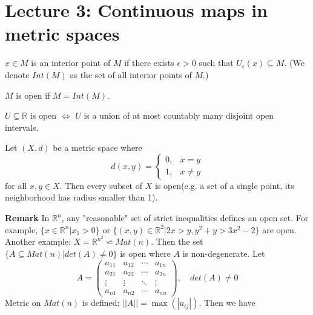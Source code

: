 \documentclass[main.tex]{subfiles}
\begin{document}
\pagestyle{plain}
\setcounter{chapter}{2}

\chapter{Lecture 3: Continuous maps in metric spaces}
\label{chap:chapter3}

\begin{definition}
    $x\in M$ is an interior point of $M$ if there exists $\epsilon > 0$ such that $U_{\epsilon} (x) \subseteq M$. (We denote $Int(M)$ as the set of all interior points of $M$.)
\end{definition}

\begin{definition}
    $M$ is open if $M = Int(M)$. 
\end{definition}
\begin{theorem}
    $U \subseteq \mathbb{R}$ is open $\Longleftrightarrow$ $U$ is a union of at most countably many disjoint open intervals.
\end{theorem}
\begin{example}
    Let $(X, d)$ be a metric space where \[ d(x, y) = \begin{cases} 0, & x = y \\ 1, & x \ne y \end{cases} \] for all $x, y \in X$. Then every subset of $X$ is open(e.g. a set of a single point, its neighborhood has radius smaller than 1).
\end{example}
\par \noindent \textbf{Remark} In $\mathbb{R}^n$, any "reasonable" set of strict inequalities defines an open set. For example, $\{x\in \mathbb{R}^n| x_1 > 0\}$ or $\{(x, y)\in \mathbb{R}^2| 2x > y, y^2 + y > 3x^2 -2\}$ are open. Another example: $X = \mathbb{R}^{n^2} \backsimeq  Mat(n)$. Then the set $\{A \subseteq Mat(n)| det(A) \neq 0\}$ is open where $A$ is non-degenerate. Let 
\begin{equation}
    A = \begin{pmatrix}
        a_{11} & a_{12} & \cdots & a_{1n} \\
        a_{21} & a_{22} & \cdots & a_{2n} \\
        \vdots & \vdots & \ddots & \vdots \\
        a_{n1} & a_{n2} & \cdots & a_{nn}
    \end{pmatrix}, \quad det(A) \neq 0
\end{equation}
Metric on $Mat(n)$ is defined: $||A|| = \max(|a_{ij}|)$. Then we have 
\end{document}
